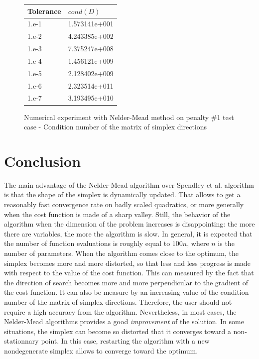 \begin{figure}[htbp]
\begin{center}
\begin{tabular}{|l|l|}
\hline
Tolerance & $cond(D)$ \\
\hline
1.e-1 & 1.573141e+001 \\
1.e-2 & 4.243385e+002 \\
1.e-3 & 7.375247e+008 \\
1.e-4 & 1.456121e+009 \\
1.e-5 & 2.128402e+009 \\
1.e-6 & 2.323514e+011 \\
1.e-7 & 3.193495e+010 \\
\hline
\end{tabular}
\end{center}
\caption{Numerical experiment with Nelder-Mead method on penalty \#1 test case - 
Condition number of the matrix of simplex directions}
\label{fig-nm-torczon-tablecond}
\end{figure}


\section{Conclusion}

The main advantage of the Nelder-Mead algorithm over Spendley et al.
algorithm is that the shape of the simplex is dynamically updated.
That allows to get a reasonably fast convergence rate on badly scaled
quadratics, or more generally when the cost function is made 
of a sharp valley. Still, the behavior of the algorithm when the 
dimension of the problem increases is disappointing: the more there are 
variables, the more the algorithm is slow. In general, it is expected 
that the number of function evaluations is roughly equal to $100n$, where 
$n$ is the number of parameters.
When the algorithm comes close to the optimum, the simplex becomes more and 
more distorted, so that less and less progress is made with respect to the 
value of the cost function. This can measured by the fact that the 
direction of search becomes more and more perpendicular to the gradient of the 
cost function. It can also be measure by an increasing value of the 
condition number of the matrix of simplex directions. Therefore, the user 
should not require a high accuracy from the algorithm. Nevertheless, in most cases,
the Nelder-Mead algorithms provides a good \emph{improvement} of the 
solution.
In some situations, the simplex can become so distorted that it converges
toward a non-stationnary point. In this case, restarting the algorithm with 
a new nondegenerate simplex allows to converge toward the optimum.

